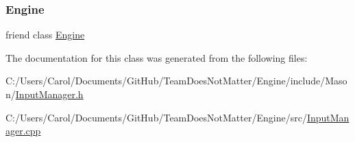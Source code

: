 \subsubsection{\texorpdfstring{Engine}{Engine}}
{\footnotesize\ttfamily friend class \hyperlink{class_mason_1_1_engine}{Engine}\hspace{0.3cm}{\ttfamily [friend]}}



The documentation for this class was generated from the following files\+:\begin{DoxyCompactItemize}
\item 
C\+:/\+Users/\+Carol/\+Documents/\+Git\+Hub/\+Team\+Does\+Not\+Matter/\+Engine/include/\+Mason/\hyperlink{_input_manager_8h}{Input\+Manager.\+h}\item 
C\+:/\+Users/\+Carol/\+Documents/\+Git\+Hub/\+Team\+Does\+Not\+Matter/\+Engine/src/\hyperlink{_input_manager_8cpp}{Input\+Manager.\+cpp}\end{DoxyCompactItemize}
